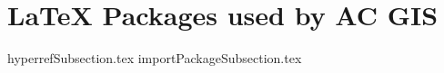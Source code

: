 \documentclass[class=article , crop=false, titlepage, twoside, multi={itemize, figure, verbatim}, float=false]{standalone}
\title{}  %
\begin{document}
\ifstandalone
\maketitle %
\clearpage
\tableofcontents %
\clearpage
\fi

\section[\LaTeX{} Packages]{\LaTeX{} Packages used by AC GIS}

{hyperrefSubsection.tex}
{importPackageSubsection.tex}
\end{document}
